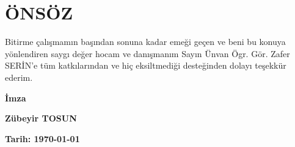 \section*{ÖNSÖZ}
\vspace{.5cm}
Bitirme çalışmamın başından sonuna kadar emeği geçen ve beni bu konuya yönlendiren saygı değer hocam ve danışmanım Sayın Ünvan Ögr. Gör. Zafer SERİN’e tüm katkılarından ve hiç eksiltmediği desteğinden dolayı teşekkür ederim.

\vspace{2cm}
\begin{flushright}
\begin{minipage}{5cm}
\begin{center}
\textbf{İmza}

\textbf{Zübeyir TOSUN}

\textbf{Tarih: {\today}}\hfill
\end{center}
\end{minipage}
\end{flushright}
